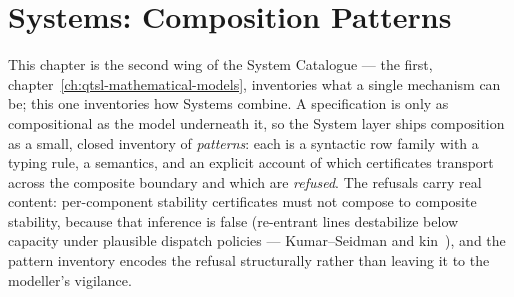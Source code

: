 \chapter{Systems: Composition Patterns}
\label{ch:qtsl-composition-patterns}

\noindent\draftmark\medskip

This chapter is the second wing of the System Catalogue --- the first,
chapter~\ref{ch:qtsl-mathematical-models}, inventories what a single mechanism
can be; this one inventories how Systems combine. A specification is
only as compositional as the model underneath it, so the System layer
ships composition as a small, closed inventory of \emph{patterns}:
each is a syntactic row family with a typing rule, a semantics, and
an explicit account of which certificates transport across the
composite boundary and which are
\emph{refused}. The refusals carry real content: per-component stability
certificates must not compose to composite stability, because that
inference is false (re-entrant lines destabilize below capacity under
plausible dispatch policies --- Kumar--Seidman and
kin~\cite{kumar1990dynamic}), and the
pattern inventory encodes the refusal structurally rather than leaving
it to the modeller's vigilance.

